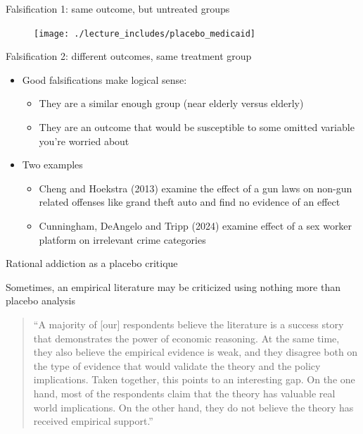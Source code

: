 \documentclass{beamer}
\begin{document}
\begin{frame}{Falsification 1: same outcome, but untreated groups}
		
		\begin{figure}
		\texttt{[image: ./lecture\_includes/placebo\_medicaid]}
		\end{figure}

\end{frame}

\begin{frame}{Falsification 2: different outcomes, same treatment group}
	\begin{itemize}
	\item Good falsifications make logical sense:  
		\begin{itemize}
		\item They are a similar enough group (near elderly versus elderly) 
		\item They are an outcome that would be susceptible to some omitted variable you're worried about
		\end{itemize}
	\item Two examples
		\begin{itemize}
		\item Cheng and Hoekstra (2013) examine the effect of a gun laws on non-gun related offenses like grand theft auto and find no evidence of an effect 
		\item Cunningham, DeAngelo and Tripp (2024) examine effect of a sex worker platform on irrelevant crime categories
		\end{itemize}
	\end{itemize}
\end{frame}



\begin{frame}{Rational addiction as a placebo critique}


Sometimes, an empirical literature may be criticized using nothing more than placebo analysis

\begin{quote}``A majority of [our] respondents believe the literature is a success story that demonstrates the power of economic reasoning.  At the same time, they also believe the empirical evidence is weak, and they disagree both on the type of evidence that would validate the theory and the policy implications. Taken together, this points to an interesting gap.  On the one hand, most of the respondents claim that the theory has valuable real world implications.  On the other hand, they do not believe the theory has received empirical support.''
\end{quote}

\end{frame}
\end{document}
